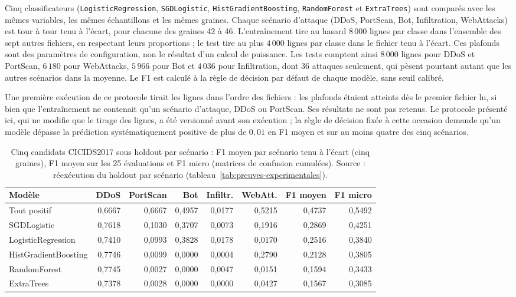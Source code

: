Cinq classificateurs (\texttt{LogisticRegression}, \texttt{SGDLogistic}, \texttt{HistGradientBoosting}, \texttt{RandomForest} et \texttt{ExtraTrees}) sont comparés avec les mêmes variables, les mêmes échantillons et les mêmes graines. Chaque scénario d'attaque (DDoS, PortScan, Bot, Infiltration, WebAttacks) est tour à tour tenu à l'écart, pour chacune des graines 42 à 46. L'entraînement tire au hasard $8\,000$ lignes par classe dans l'ensemble des sept autres fichiers, en respectant leurs proportions ; le test tire au plus $4\,000$ lignes par classe dans le fichier tenu à l'écart. Ces plafonds sont des paramètres de configuration, non le résultat d'un calcul de puissance. Les tests comptent ainsi $8\,000$ lignes pour DDoS et PortScan, $6\,180$ pour WebAttacks, $5\,966$ pour Bot et $4\,036$ pour Infiltration, dont 36 attaques seulement, qui pèsent pourtant autant que les autres scénarios dans la moyenne. Le F1 est calculé à la règle de décision par défaut de chaque modèle, sans seuil calibré.

Une première exécution de ce protocole tirait les lignes dans l'ordre des fichiers : les plafonds étaient atteints dès le premier fichier lu, si bien que l'entraînement ne contenait qu'un scénario d'attaque, DDoS ou PortScan. Ses résultats ne sont pas retenus. Le protocole présenté ici, qui ne modifie que le tirage des lignes, a été versionné avant son exécution ; la règle de décision fixée à cette occasion demande qu'un modèle dépasse la prédiction systématiquement positive de plus de $0{,}01$ en F1 moyen et sur au moins quatre des cinq scénarios.

\begin{table}[H]
\centering
\caption[Cinq candidats CICIDS2017 sous holdout par scénario.]{Cinq candidats CICIDS2017 sous holdout par scénario : F1 moyen par scénario tenu à l'écart (cinq graines), F1 moyen sur les 25 évaluations et F1 micro (matrices de confusion cumulées). Source : réexécution du holdout par scénario (tableau~\ref{tab:preuves-experimentales}).}
\label{tab:cicids-candidats}
\footnotesize
\setlength{\tabcolsep}{4pt}
\begin{tabular}{lrrrrrrr}
\toprule
\textbf{Modèle} & \textbf{DDoS} & \textbf{PortScan} & \textbf{Bot} & \textbf{Infiltr.} & \textbf{WebAtt.} & \textbf{F1 moyen} & \textbf{F1 micro} \\
\midrule
Tout positif & 0,6667 & 0,6667 & 0,4957 & 0,0177 & 0,5215 & 0,4737 & 0,5492 \\
SGDLogistic & 0,7618 & 0,1030 & 0,3707 & 0,0073 & 0,1916 & 0,2869 & 0,4251 \\
LogisticRegression & 0,7410 & 0,0993 & 0,3828 & 0,0178 & 0,0170 & 0,2516 & 0,3840 \\
HistGradientBoosting & 0,7746 & 0,0099 & 0,0000 & 0,0004 & 0,2790 & 0,2128 & 0,3805 \\
RandomForest & 0,7745 & 0,0027 & 0,0000 & 0,0047 & 0,0151 & 0,1594 & 0,3433 \\
ExtraTrees & 0,7378 & 0,0028 & 0,0000 & 0,0000 & 0,0427 & 0,1567 & 0,3085 \\
\bottomrule
\end{tabular}
\end{table}

